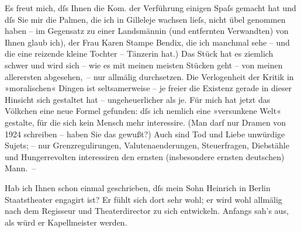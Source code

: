 \pstart
           Es freut mich, dſs Ihnen die Kom. der Verführung
               einigen Spaſs gemacht hat und dſs Sie mir die Palmen, die ich in Gilleleje wachsen {\pb}lieſs,
               nicht übel genommen haben – \label{T_L02423-1v}\label{T_L02423-1}im
               Gegensatz zu einer Landsmännin (und entfernten Verwandten) von Ihnen glaub ich), der
               Frau Karen Stampe Bendix, die ich manchmal sehe
               – und die eine reizende kleine Tochter – Tänzerin hat.) Das Stück hat es ziemlich schwer und wird sich – wie es mit
               meinen meisten Stücken geht – von meinen allerersten abgesehen, – nur allmälig
               durchsetzen. Die Verlogenheit der Kritik in »moralischen« Dingen ist seltsamerweise –
               je freier die Existenz gerade in dieser Hinsicht sich gestaltet hat – ungeheuerlicher
               als je. Für mich hat jetzt das Völkchen eine neue Formel gefunden: dſs ich nemlich
               eine »versunkene Welt« gestalte, für die sich kein Mensch mehr interessire. (Man darf
               nur Dramen von 1924 schreiben – haben Sie das gewußt?) Auch sind Tod und
               Liebe unwürdige Sujets; – nur Grenzregulirungen, Valutenaenderungen, Steuerfragen,
               Diebstähle und Hungerrevolten interessiren den {\pb}ernsten (insbesondere ernsten deutschen) Mann. –\pend
           
\pstart
           Hab ich Ihnen schon einmal geschrieben, dſs mein Sohn Heinrich in Berlin
                  Staatstheater engagirt ist? Er fühlt sich dort sehr wohl; er wird wohl
               allmälig nach dem Regisseur und Theaterdirector zu sich entwickeln. Anfangs sah’s
               aus, als würd er Kapellmeister werden.\pend
           
